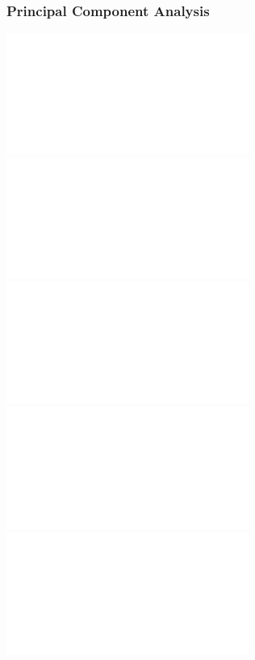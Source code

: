 \documentclass[11pt]{beamer}
\newcommand{\source}[1]{\begin{textblock*}{4cm}(8.7cm,8.6cm)
		\begin{beamercolorbox}[ht=0.5cm,right]{framesource}
			\usebeamerfont{framesource}\usebeamercolor[fg]{framesource} {#1}
		\end{beamercolorbox}
\end{textblock*}}
\begin{document}

	\begin{frame}
\frametitle{Principal Component Analysis}
	\begin{center}
		\includegraphics<1>{figures/pca1.pdf}
		\includegraphics<2>{figures/pca2.pdf}
		\includegraphics<3>{figures/pca3.pdf}
		\includegraphics<4>{figures/pca4.pdf}
		\includegraphics<5->{figures/pca5.pdf}						
	\end{center}
\end{frame}
\end{document}

